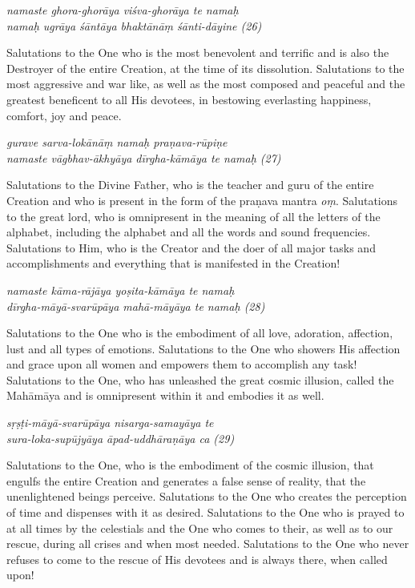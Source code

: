 \documentclass[11pt,oneside,a4paper]{article}
\newenvironment{shloka}[1]
  {\bigskip\center#1\varwidth{\linewidth}}
  {\endvarwidth\endcenter\bigskip}
\newcommand{\tl}[1]{\emph{#1}}
\begin{document}
\begin{shloka}\itshape
  namaste ghora-ghorāya viśva-ghorāya te namaḥ\\
  namaḥ ugrāya śāntāya bhaktānāṃ śānti-dāyine (26)
\end{shloka}

Salutations to the One who is the most benevolent and terrific and is also
the Destroyer of the entire Creation, at the time of its dissolution.
Salutations to the most aggressive and war like, as well as the most composed
and peaceful and the greatest beneficent to all His devotees, in bestowing
everlasting happiness, comfort, joy and peace.

\begin{shloka}\itshape
  gurave sarva-lokānāṃ namaḥ praṇava-rūpiṇe\\
  namaste vāgbhav-ākhyāya dīrgha-kāmāya te namaḥ (27)
\end{shloka}

Salutations to the Divine Father, who is the teacher and guru of the entire
Creation and who is present in the form of the praṇava mantra \tl{oṃ}.
Salutations to the great lord, who is omnipresent in the meaning of all
the letters of the alphabet, including the alphabet and all the words and sound
frequencies. Salutations to Him, who is the Creator and the doer of all major
tasks and accomplishments and everything that is manifested in the Creation!

\begin{shloka}\itshape
  namaste kāma-rājāya yoṣita-kāmāya te namaḥ\\
  dīrgha-māyā-svarūpāya mahā-māyāya te namaḥ (28)
\end{shloka}

Salutations to the One who is the embodiment of all love, adoration, affection,
lust and all types of emotions. Salutations to the One who showers His affection
and grace upon all women and empowers them to accomplish any task! Salutations
to the One, who has unleashed the great cosmic illusion, called the Mahāmāya
and is omnipresent within it and embodies it as well.

\begin{shloka}\itshape
  sṛṣṭi-māyā-svarūpāya nisarga-samayāya te\\
  sura-loka-supūjyāya āpad-uddhāraṇāya ca (29)
\end{shloka}

Salutations to the One, who is the embodiment of the cosmic illusion, that
engulfs the entire Creation and generates a false sense of reality, that
the unenlightened beings perceive. Salutations to the One who creates
the perception of time and dispenses with it as desired. Salutations to the One
who is prayed to at all times by the celestials and the One who comes to their,
as well as to our rescue, during all crises and when most needed. Salutations
to the One who never refuses to come to the rescue of His devotees and is always
there, when called upon!
\end{document}
